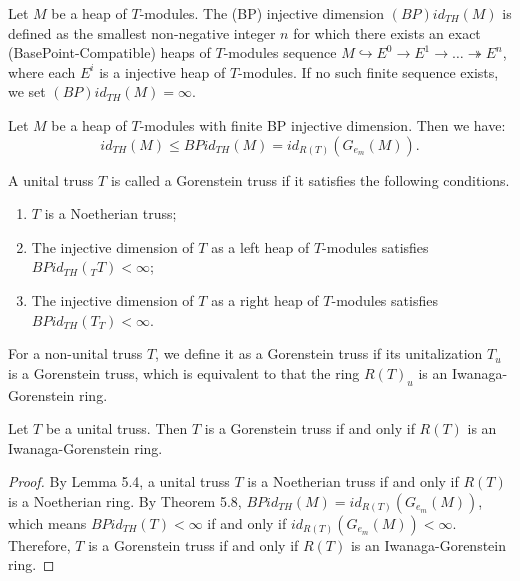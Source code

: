 \documentclass[11pt, twoside]{article}
\begin{document}
\begin{definition}
Let $M$ be a heap of $T$-modules. The (BP) injective dimension $(BP)id_{TH}(M)$ is defined as the smallest non-negative integer $n$ for which there exists an exact (BasePoint-Compatible) heaps of $T$-modules sequence $M \hookrightarrow E^{0} \to E^{1} \to \dots \twoheadrightarrow E^n $, where each $E^i$ is a injective heap of $T$-modules. If no such finite sequence exists, we set $(BP)id_{TH}(M) = \infty$.
\end{definition}

\begin{theorem}
Let $M$ be a heap of $T$-modules with finite BP injective dimension. Then we have:
$$ id_{TH}(M) \leq BPid_{TH}(M) = id_{R(T)}(G_{e_m}(M)).$$
\end{theorem}


\begin{definition}
A unital truss $T$ is called a Gorenstein truss if it satisfies the following conditions.
\begin{enumerate}
    \item[(i)] $T$ is a Noetherian truss;
    \item[(ii)] The injective dimension of $T$ as a left heap of $T$-modules satisfies $BPid_{TH}(_TT) < \infty$;
    \item[(iii)] The injective dimension of $T$ as a right heap of $T$-modules satisfies $BPid_{TH}(T_T) < \infty$.
\end{enumerate}
\end{definition}

\begin{remark}
For a non-unital truss $T$, we define it as a Gorenstein truss if its unitalization $T_u$ is a Gorenstein truss, which is equivalent to that the ring $R(T)_u$ is an Iwanaga-Gorenstein ring.
\end{remark}

\begin{theorem}
Let $T$ be a unital truss. Then $T$ is a Gorenstein truss if and only if $R(T)$ is an Iwanaga-Gorenstein ring.
\end{theorem}

\begin{proof}
By Lemma 5.4, a unital truss $T$ is a Noetherian truss if and only if $R(T)$ is a Noetherian ring. By Theorem 5.8, $BPid_{TH}(M)= id_{R(T)}(G_{e_m}(M))$, which means $BPid_{TH}(T) < \infty$ if and only if $id_{R(T)}(G_{e_m}(M)) < \infty$. Therefore, $T$ is a Gorenstein truss if and only if $R(T)$ is an Iwanaga-Gorenstein ring.
\end{proof}
\end{document}
